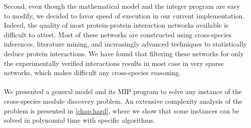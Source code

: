 Second, even though the mathematical model and the integer program are easy to modify, we decided to favor speed of execution in our current implementation.
Indeed, the quality of most protein-protein interaction networks available is difficult to attest.
Most of these networks are constructed using cross-species inferences, literature mining, and increasingly advanced techniques to statistically deduce protein interactions.
We have found that filtering these networks for only the experimentally verified interactions results in most case in very sparse networks, which makes difficult any cross-species reasoning.

\paragraph{}
We presented a general model and its MIP program to solve any instance of the cross-species module discovery problem.
An extensive complexity analysis of the problem is presented in \cref{chap:hard}, where we show that some instances can be solved in polynomial time with specific algorithms.
